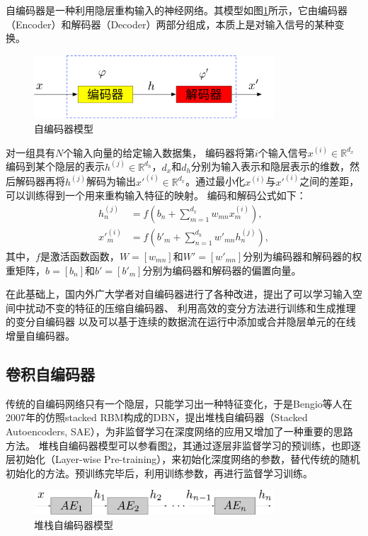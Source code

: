 自编码器是一种利用隐层重构输入的神经网络。其模型如图\ref{fig:ae}所示，它由编码器（Encoder）和解码器（Decoder）两部分组成，本质上是对输入信号的某种变换。
\begin{figure}[hbt]
	\centering
	\includegraphics[width=9cm]{figures/AE/ae}
	\caption{自编码器模型}
	\label{fig:ae}
\end{figure}
对一组具有$N$个输入向量的给定输入数据集，
编码器将第$i$个输入信号$x^{(i)}\in\mathbb{R}^{d_x}$编码到某个隐层的表示$h^{(j)}\in\mathbb{R}^{d_h}$，$d_x$和$d_h$分别为输入表示和隐层表示的维数，然后解码器再将$h^{(j)}$解码为输出$x'^{(i)}\in\mathbb{R}^{d_x}$。通过最小化$x^{(i)}$与$x'^{(i)}$之间的差距，可以训练得到一个用来重构输入特征的映射。
编码和解码公式如下：
\begin{align}
	h^{(j)}_n &= f(b_n+\sum_{m=1}^{d_x}w_{mn}x^{(i)}_m), \\
	x'^{(i)}_m &= f(b'_m+\sum_{n=1}^{d_h}w'_{mn}h^{(j)}_n),
\end{align}
其中，$f$是激活函数函数，${W}=[w_{mn}]$和${W}'=[w'_{mn}]$分别为编码器和解码器的权重矩阵，${b}=[b_n]$和${b'}=[b'_m]$分别为编码器和解码器的偏置向量。

在此基础上，国内外广大学者对自编码器进行了各种改进，提出了可以学习输入空间中扰动不变的特征的压缩自编码器、
利用高效的变分方法进行训练和生成推理的变分自编码器
以及可以基于连续的数据流在运行中添加或合并隐层单元的在线增量自编码器。

\subsection{卷积自编码器}
传统的自编码网络只有一个隐层，只能学习出一种特征变化，于是Bengio等人在2007年的仿照stacked RBM构成的DBN，提出堆栈自编码器（Stacked Autoencoders, SAE），为非监督学习在深度网络的应用又增加了一种重要的思路方法。
堆栈自编码器模型可以参看图\ref{fig:sae}，其通过逐层非监督学习的预训练，也即逐层初始化（Layer-wise Pre-training），来初始化深度网络的参数，替代传统的随机初始化的方法。预训练完毕后，利用训练参数，再进行监督学习训练。
\begin{figure}[hbt]
	\centering
	\includegraphics[width=9cm]{figures/AE/sae}
	\caption{堆栈自编码器模型}
	\label{fig:sae}
\end{figure}

